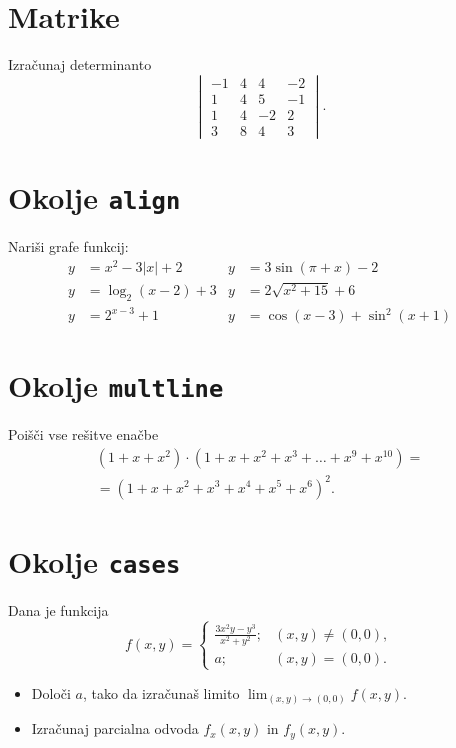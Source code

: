 \documentclass[a4paper,12pt]{article}
\begin{document}
\section*{Matrike}
Izračunaj determinanto
\[
\begin{vmatrix}
   -1 & 4 & 4 & -2 \\
   1 & 4 & 5 & -1 \\
   1 & 4 & -2 & 2 \\
   3 & 8 & 4 & 3
\end{vmatrix}.
\]

\section*{Okolje \texttt{align}}
Nariši grafe funkcij:
\begin{align*}
   y &= x^2 - 3|x| + 2    & y &= 3 \sin(\pi+x) - 2 \\
   y &= \log_2(x-2) + 3   & y &= 2 \sqrt{x^2+15} + 6 \\
   y &= 2^{x-3} + 1       & y &= \cos(x-3) + \sin^2(x+1)
\end{align*}

\section*{Okolje \texttt{multline}}
Poišči vse rešitve enačbe
\begin{multline*}
(1+x+x^2) \cdot (1+x+x^2+x^3+\ldots+x^9+x^{10}) = \\
=(1+x+x^2+x^3+x^4+x^5+x^6)^2.
\end{multline*}

\section*{Okolje \texttt{cases}}
Dana je funkcija
\[
f(x,y) = \begin{cases}
   \frac{3x^2y-y^3}{x^2+y^2}; & (x,y) \ne (0,0), \\
   a; & (x,y) = (0,0).
\end{cases}
\]
\begin{itemize}
\item Določi \(a\), tako da izračunaš limito \( \lim_{(x,y)\to(0,0)} f(x,y) \).
\item Izračunaj parcialna odvoda \(f_x(x,y)\) in \(f_y(x,y)\).
\end{itemize}
\end{document}
